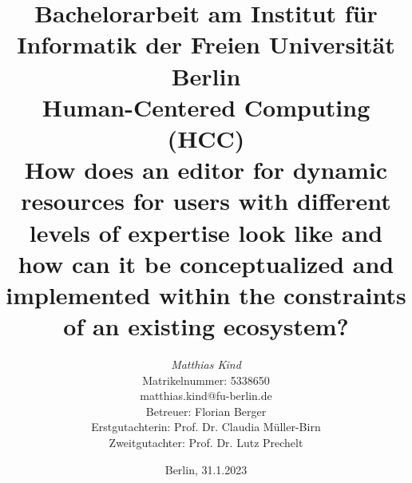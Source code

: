 %
\pagestyle{empty}

\begin{titlepage}

\title{
{\small Bachelorarbeit am Institut für Informatik der Freien Universität Berlin}\\
{\small Human-Centered Computing (HCC)}\\
[6ex]
{\LARGE How does an editor for dynamic resources for users with different levels of expertise look like and how can it be conceptualized and implemented within the constraints of an existing ecosystem?}}


\author{
{\emph{\normalsize{Matthias Kind}}}\\
{\normalsize Matrikelnummer: 5338650}\\
{\normalsize matthias.kind@fu-berlin.de}\\ 
[18ex]   
{\normalsize Betreuer: Florian Berger} \\
{\normalsize Erstgutachterin: Prof. Dr. Claudia Müller-Birn} \\
{\normalsize Zweitgutachter: Prof. Dr. Lutz Prechelt}}
\vspace{6ex}
\date{\normalsize Berlin, 31.1.2023}
\maketitle
\end{titlepage}
